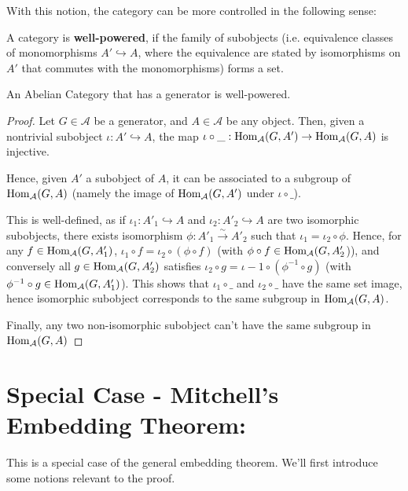 \documentclass{article}
\begin{document}
With this notion, the category can be more controlled in the following sense:
\begin{defn}
    A category is \textbf{well-powered}, if the family of subobjects (i.e. equivalence classes of monomorphisms $A'\hookrightarrow A$, where the equivalence are stated by isomorphisms on $A'$ that commutes with the monomorphisms) forms a set.
\end{defn}

\hfil

\begin{prop}
    An Abelian Category that has a generator is well-powered.
\end{prop}
\begin{proof}
    Let $G\in\mathcal{A}$ be a generator, and $A\in \mathcal{A}$ be any object. Then, given a nontrivial subobject $\iota:A'\hookrightarrow A$, the map $\iota\circ \_:\mathrm{Hom}_\mathcal{A}(G,A')\rightarrow \mathrm{Hom}_\mathcal{A}(G,A)$ is injective. 

    \hfil

    Hence, given $A'$ a subobject of $A$, it can be associated to a subgroup of $\mathrm{Hom}_\mathcal{A}(G,A)$ (namely the image of $\mathrm{Hom}_\mathcal{A}(G,A')$ under $\iota\circ\_$). 
    
    This is well-defined, as if $\iota_1:A'_1\hookrightarrow A$ and $\iota_2:A'_2\hookrightarrow A$ are two isomorphic subobjects, there exists isomorphism $\phi:A'_1\xrightarrow{\sim}A'_2$ such that $\iota_1 = \iota_2\circ \phi$. Hence, for any $f\in \mathrm{Hom}_\mathcal{A}(G,A'_1)$, $\iota_1\circ f = \iota_2\circ (\phi\circ f)$ (with $\phi\circ f\in \mathrm{Hom}_\mathcal{A}(G,A'_2$)), and conversely all $g\in \mathrm{Hom}_\mathcal{A}(G,A'_2)$ satisfies $\iota_2\circ g = \iota-1\circ (\phi^{-1}\circ g)$ (with$\phi^{-1}\circ g\in\mathrm{Hom}_\mathcal{A}(G,A'_1)$). This shows that $\iota_1\circ\_$ and $\iota_2\circ\_$ have the same set image, hence isomorphic subobject corresponds to the same subgroup in $\mathrm{Hom}_\mathcal{A}(G,A)$.

    \hfil

    Finally, any two non-isomorphic subobject can't have the same subgroup in $\mathrm{Hom}_\mathcal{A}(G,A)$
\end{proof}

\newpage

\section{Special Case - Mitchell's Embedding Theorem:}

This is a special case of the general embedding theorem. We'll first introduce some notions relevant to the proof.
\end{document}
